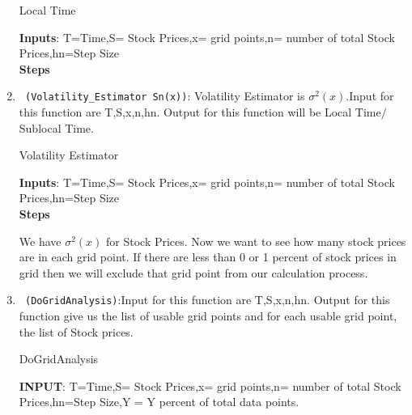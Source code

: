 \begin{enumerate}
  \begin{algorithm}
  \caption{Local Time}
  \bigskip
  \textbf{Inputs}: T=Time,S= Stock Prices,x= grid points,n= number of total Stock Prices,hn=Step Size\\
  \textbf{Steps}
  \end{algorithm}
  \item \verb! (Volatility_Estimator Sn(x))!: Volatility Estimator is $\sigma^2(x)$.Input for this function are T,S,x,n,hn.
 Output for this function will be Local Time$/$Sublocal Time.
  \begin{algorithm}
  \caption{Volatility Estimator}
  \bigskip
  \textbf{Inputs}: T=Time,S= Stock Prices,x= grid points,n= number of total Stock Prices,hn=Step Size\\
  \textbf{Steps}
  \end{algorithm}
 We have $\sigma^2(x)$ for Stock Prices. Now we want to see how many stock prices are in each grid point. 
 If there are less than 0 or 1 percent of stock prices in grid then we will exclude that grid point from
 our calculation process.
  \item \verb! (DoGridAnalysis)!:Input for this function are T,S,x,n,hn.
 Output for this function give us the list of usable grid points and for each usable grid point, the list of Stock prices.
  \begin{algorithm}
  \caption{DoGridAnalysis}
  \bigskip
  \textbf{INPUT}: T=Time,S= Stock Prices,x= grid points,n= number of total Stock Prices,hn=Step Size,Y = Y percent of total data points.\\

\end{algorithm}
\end{enumerate}
